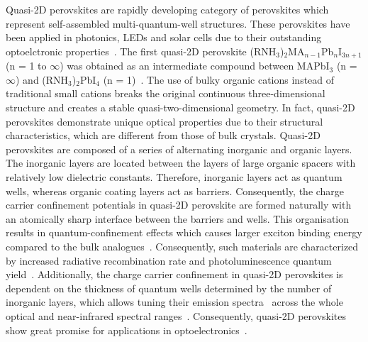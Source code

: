 \documentclass[journal=chreay,manuscript=review]{achemso}
\begin{document}
Quasi-2D perovskites are rapidly developing category of perovskites which represent self-assembled multi-quantum-well structures. These perovskites have been applied in photonics, LEDs and solar cells due to their outstanding optoelctronic  properties~\cite{byun2016efficient,cheng2020multiple,zhang2021high}. The first quasi-2D perovskite  (RNH$_3$)$_2$MA$_{n-1}$Pb$_n$I$_{3n+1}$ (n = 1 to $\infty$) was obtained as an intermediate compound between MAPbI$_3$ (n = $\infty$) and (RNH$_3$)$_2$PbI$_4$ (n = 1)~\cite{calabrese1991preparation}. The use of bulky organic cations instead of traditional small cations breaks the original continuous three-dimensional structure and creates a stable quasi-two-dimensional geometry. In fact, quasi-2D perovskites demonstrate unique optical properties due to their structural characteristics, which are different from those of bulk crystals\cite{saidaminov2015high}. Quasi-2D perovskites are composed of a series of alternating inorganic and organic layers. The inorganic layers are located between the layers of large organic spacers with relatively low dielectric constants. Therefore, inorganic layers act as quantum wells, whereas organic coating layers act as barriers. Consequently, the charge carrier confinement potentials in quasi-2D perovskite are formed naturally with an atomically sharp interface between the barriers and wells. This organisation results in quantum-confinement effects which causes larger exciton binding energy compared to the bulk analogues~\cite{cheng2020multiple}. Consequently, such materials are characterized by increased radiative recombination rate and photoluminescence quantum yield~\cite{wang2016perovskite}. Additionally, the charge carrier confinement in quasi-2D perovskites is dependent on the thickness of quantum wells determined by the number of inorganic layers, which allows tuning their emission spectra~\cite{quan2018perovskites} across the whole optical and near-infrared spectral ranges~\cite{chu2020large,he2019high,wu2019alternative}. Consequently, quasi-2D perovskites show great promise for applications in optoelectronics~\cite{yang2018oriented, fu2019tailoring, tonkaev2021acceleration}.

\end{document}

